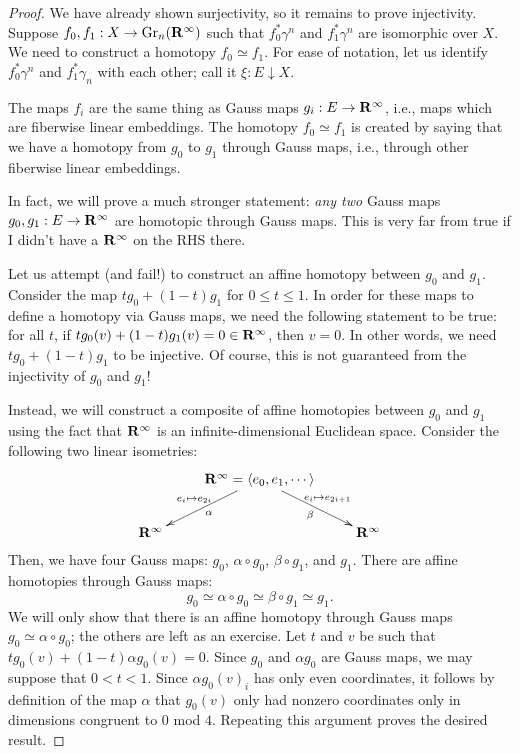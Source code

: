 \begin{proof}
    We have already shown surjectivity, so it remains to prove injectivity.
    Suppose $f_0,f_1:X\to \mathrm{Gr}_n(\mathbf R^\infty)$ such that $f_0^\ast\gamma^n$ and
    $f_1^\ast\gamma^n$ are isomorphic over $X$. We need to construct a homotopy
    $f_0\simeq f_1$. For ease of notation, let us identify $f_0^\ast\gamma^n$
    and $f_1^\ast\gamma_n$ with each other; call it $\xi:E\downarrow X$.

    The maps $f_i$ are the same thing as Gauss maps $g_i:E\to\mathbf R^\infty$, i.e.,
    maps which are fiberwise linear embeddings. The homotopy $f_0\simeq f_1$ is
    created by saying that we have a homotopy from $g_0$ to $g_1$ through Gauss
    maps, i.e., through other fiberwise linear embeddings.
    
    In fact, we will prove a much stronger statement: \emph{any two} Gauss maps
    $g_0,g_1:E\to \mathbf R^\infty$ are homotopic through Gauss maps. This is very far from
    true if I didn't have a $\mathbf R^\infty$ on the RHS there.

    Let us attempt (and fail!) to construct an affine homotopy between $g_0$
    and $g_1$. Consider the map $tg_0 + (1-t)g_1$ for $0\leq t\leq 1$. In order
    for these maps to define a homotopy via Gauss maps, we need the following
    statement to be true: for all $t$, if $tg_0(v) + (1-t)g_1(v) =
    0\in\mathbf R^\infty$, then $v=0$.  In other words, we need $tg_0+(1-t)g_1$ to be
    injective. Of course, this is not guaranteed from the injectivity of $g_0$
    and $g_1$!

    Instead, we will construct a composite of affine homotopies between $g_0$
    and $g_1$ using the fact that $\mathbf R^\infty$ is an infinite-dimensional
    Euclidean space. Consider the following two linear isometries:
    \begin{equation*}
	\xymatrix{
	    & \RR^\infty = \langle
	    e_0,e_1,\cdots\rangle\ar[dl]^\alpha_{e_i\mapsto
	    e_{2i}}\ar[dr]_\beta^{e_i\mapsto e_{2i+1}} & \\
	    \RR^\infty & & \RR^\infty
	    }
    \end{equation*}
    Then, we have four Gauss maps: $g_0$, $\alpha\circ g_0$, $\beta\circ g_1$,
    and $g_1$. There are affine homotopies through Gauss maps:
    $$g_0\simeq \alpha \circ g_0\simeq \beta\circ g_1\simeq g_1.$$
    We will only show that there is an affine homotopy through Gauss maps $g_0
    \simeq \alpha \circ g_0$; the others are left as an exercise. Let $t$ and
    $v$ be such that $tg_0(v) + (1-t)\alpha g_0(v) = 0$. Since $g_0$ and
    $\alpha g_0$ are Gauss maps, we may suppose that $0<t<1$. Since $\alpha
    g_0(v)_i$ has only even coordinates, it follows by definition of the map
    $\alpha$ that $g_0(v)$ only had nonzero coordinates only in dimensions
    congruent to $0$ mod $4$. Repeating this argument proves the desired
    result.
\end{proof}
